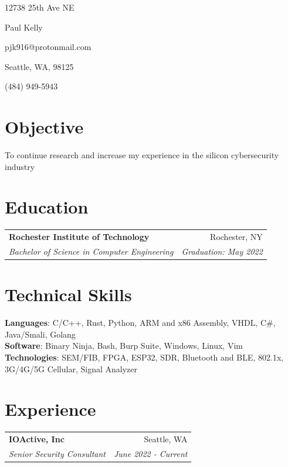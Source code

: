 \documentclass[letterpaper,11pt]{article}
\makeatletter
\newcommand{\resumeSubheading}[4]{
  \vspace{2pt}
    \begin{tabular*}{0.97\textwidth}[t]{l@{\extracolsep{\fill}}r}
	\textbf{#1} & #2 \\
	\textit{\small#3}  & \textit{\small#4} \\
    \end{tabular*} \vspace{-5pt}
}
\newcommand{\headerbox}[5]{%
    \noindent\parbox{0.333\textwidth}{#1\hfill}\parbox{0.333\textwidth}{\hfil{\LARGE #2}\hfil}\parbox{0.333\textwidth}{\hfill #3}
    \noindent\parbox{0.5\textwidth}{#4\hfill}\parbox{0.5\textwidth}{\hfill #5}
    \vspace{-15pt}
}
\makeatother
\begin{document}
%  
\headerbox{12738 25th Ave NE}{Paul Kelly}{pjk916@protonmail.com}
{Seattle, WA, 98125}{(484) 949-5943}

\section{Objective}
\qquad To continue research and increase my experience in the silicon cybersecurity industry



\section{Education}
    \resumeSubheading
      {Rochester Institute of Technology}{Rochester, NY}
      {Bachelor of Science in Computer Engineering}{Graduation: May 2022}


\section{Technical Skills}
      	\small \textbf{Languages}: C/C++, Rust, Python, ARM and x86 Assembly, VHDL, C\#, Java/Smali, Golang \\
        \vspace{2pt}
      	\small \textbf{Software}: Binary Ninja, Bash, Burp Suite, Windows, Linux, Vim \\
        \vspace{2pt}
	\small \textbf{Technologies}: SEM/FIB, FPGA, ESP32, SDR, Bluetooth and BLE, 802.1x, 3G/4G/5G Cellular, Signal Analyzer \\


\section{Experience}

    \resumeSubheading
      {IOActive, Inc}{Seattle, WA}
      {Senior Security Consultant}{June 2022 - Current}
\end{document}

